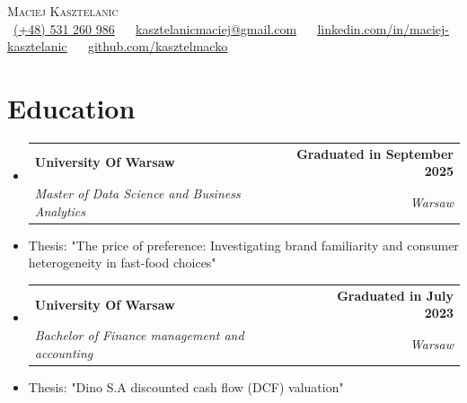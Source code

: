\documentclass[letterpaper,11pt]{article}
\makeatletter
\newcommand{\resumeItem}[1]{
  \item\small{
    {#1 \vspace{0pt}}
  }
}
\newcommand{\resumeSubheading}[4]{
  \vspace{-2pt}\item
    \begin{tabular*}{1.0\textwidth}[t]{l@{\extracolsep{\fill}}r}
      \textbf{#1} & \textbf{\small #2} \\
      \textit{\small#3} & \textit{\small #4} \\
    \end{tabular*}\vspace{-7pt}
}
\newcommand{\resumeSubHeadingListStart}{\begin{itemize}[leftmargin=0.0in, label={}]}
\newcommand{\resumeSubHeadingListEnd}{\end{itemize}}\vspace{0pt}
\newcommand{\resumeItemListStart}{\begin{itemize}}
\newcommand{\resumeItemListEnd}{\end{itemize}\vspace{-5pt}}
\makeatother
\begin{document}
\begin{center}
    {\Large \scshape Maciej Kasztelanic} \\[2mm]
    \footnotesize \raisebox{-0.1\height}
    \faPhone\ \underline{(+48) 531 260 986} ~ 
    {\faEnvelope\  \underline{kasztelanicmaciej@gmail.com}} ~ 
    {\faLinkedin\ \underline{\href{https://www.linkedin.com/in/maciej-kasztelanic-960556247/}{linkedin.com/in/maciej-kasztelanic}}}  ~
    {\faGithub\ \underline{\href{https://github.com/kasztelmacko}{github.com/kasztelmacko}}} ~
    \vspace{-8pt}
\end{center}

\section{Education}
\vspace{1mm}
  \resumeSubHeadingListStart
    \resumeSubheading
      {University Of Warsaw}{Graduated in September 2025}
      {Master of Data Science and Business Analytics
      }{Warsaw}
  \resumeSubHeadingListEnd
    \resumeItemListStart
        \resumeItem {Thesis: "The price of preference: Investigating brand familiarity and consumer heterogeneity in fast-food choices"}
    \resumeItemListEnd
    \vspace{-6pt}
  \resumeSubHeadingListStart
    \resumeSubheading
    {University Of Warsaw}{Graduated in July 2023}
    {Bachelor of Finance management and accounting
    }{Warsaw}
  \resumeSubHeadingListEnd
    \resumeItemListStart
      \resumeItem {Thesis: "Dino S.A discounted cash flow (DCF) valuation"}
    \resumeItemListEnd
    \vspace{-12pt}

\end{document}
